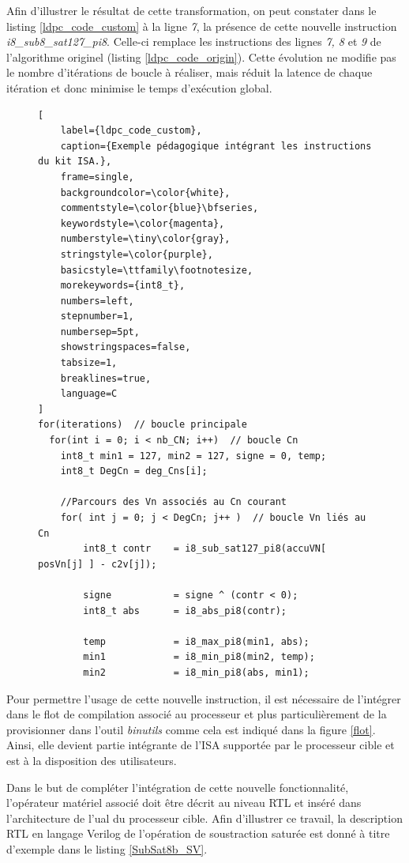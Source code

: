 \documentclass[../main.tex]{subfiles}
\begin{document}
Afin d'illustrer le résultat de cette transformation, on peut constater dans le listing \ref{ldpc_code_custom} à la ligne \textit{7}, la présence de cette nouvelle instruction \textit{i8\_sub8\_sat127\_pi8}. Celle-ci remplace les instructions des lignes \textit{7, 8} et \textit{9} de l'algorithme originel (listing \ref{ldpc_code_origin}). Cette évolution ne modifie pas le nombre d'itérations de boucle à réaliser, mais réduit la latence de chaque itération et donc minimise le temps d'exécution global.



\begin{figure}[!tb]
\begin{lstlisting}[
    label={ldpc_code_custom},      
    caption={Exemple pédagogique intégrant les instructions du kit ISA.},
    frame=single,
    backgroundcolor=\color{white},  
    commentstyle=\color{blue}\bfseries,
    keywordstyle=\color{magenta},
    numberstyle=\tiny\color{gray},
    stringstyle=\color{purple},
    basicstyle=\ttfamily\footnotesize,
    morekeywords={int8_t},
    numbers=left,
    stepnumber=1,
    numbersep=5pt,                 
    showstringspaces=false,
    tabsize=1,
    breaklines=true,
    language=C
]
for(iterations)  // boucle principale
  for(int i = 0; i < nb_CN; i++)  // boucle Cn
    int8_t min1 = 127, min2 = 127, signe = 0, temp;
    int8_t DegCn = deg_Cns[i];
      
    //Parcours des Vn associés au Cn courant 
    for( int j = 0; j < DegCn; j++ )  // boucle Vn liés au Cn
        int8_t contr    = i8_sub_sat127_pi8(accuVN[ posVn[j] ] - c2v[j]); 
      
        signe           = signe ^ (contr < 0);
        int8_t abs      = i8_abs_pi8(contr); 
     
        temp            = i8_max_pi8(min1, abs);
        min1            = i8_min_pi8(min2, temp);
        min2            = i8_min_pi8(abs, min1); 
\end{lstlisting}
\end{figure}

Pour permettre l'usage de cette nouvelle instruction, il est nécessaire de l'intégrer dans le flot de compilation associé au processeur et plus particulièrement de la provisionner dans l'outil \textit{binutils} comme cela est indiqué dans la figure \ref{flot}. Ainsi, elle devient partie intégrante de l'ISA supportée par le processeur cible et est à la disposition des utilisateurs.

Dans le but de compléter l'intégration de cette nouvelle fonctionnalité, l'opérateur matériel associé doit être décrit au niveau RTL et inséré dans l'architecture de l'\acrshort{ual} du processeur cible. Afin d'illustrer ce travail, la description RTL en langage Verilog de l'opération de soustraction saturée est donné à titre d'exemple dans le listing \ref{SubSat8b_SV}.
    
\end{document}
